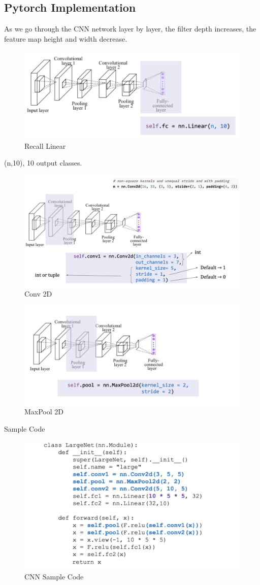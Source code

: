 \documentclass[11pt, english]{article}
\begin{document}
\subsection{Pytorch Implementation}
As we go through the CNN network layer by layer, the filter depth increases, the feature map height and width decrease.
\begin{figure}[H]
    \centering
    \includegraphics[width=0.75\linewidth]{CNN in Pytorch.png}
    \caption{Recall Linear}
    \label{fig:enter-label}
\end{figure}
(n,10), 10 output classes.
\begin{figure}[H]
    \centering
    \includegraphics[width=0.75\linewidth]{Conv 2D.png}
    \caption{Conv 2D}
    \label{fig:enter-label}
\end{figure}
\begin{figure}[H]
    \centering
    \includegraphics[width=0.75\linewidth]{MaxPool 2D.png}
    \caption{MaxPool 2D}
    \label{fig:enter-label}
\end{figure}
Sample Code
\begin{figure}[H]
    \centering
    \includegraphics[width=0.75\linewidth]{CNN Sample Code.png}
    \caption{CNN Sample Code}
    \label{fig:enter-label}
\end{figure}
\end{document}
